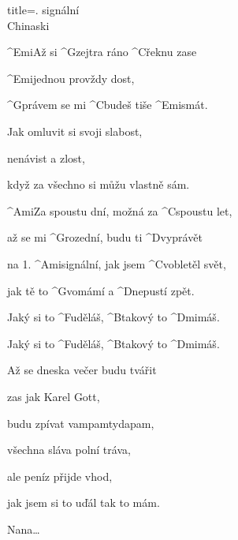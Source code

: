 \begin{song}{title=\predtitle {}. signální \\\large Chinaski  \vspace*{-0.3cm}}  %
\begin{centerjustified}
\nejnejvetsi
\sloka 
	^{Emi}Až si ^{G\z }zejtra ráno ^{C}řeknu zase 

	^{Emi}jednou provždy dost,

	^{G\z }právem se mi ^{C\z }budeš tiše ^{Emi}smát.

	Jak omluvit si svoji slabost,

	nenávist a zlost,

	když za všechno si můžu vlastně sám. 

	^{Ami}Za spoustu dní, možná za ^{C\z }spoustu let, 

	až se mi ^{G\z }rozední, budu ti ^{D\z }vyprávět 

	na 1. ^{Ami\z }signální, jak jsem ^{C\z }vobletěl svět, 

	jak tě to ^{G\z }vomámí a ^{D\z }nepustí zpět.

	Jaký si to ^{F\z }uděláš, ^{B\z }takový to ^{Dmi}máš. 

	Jaký si to ^{F\z }uděláš, ^{B\z }takový to ^{Dmi}máš. 

\sloka
	Až se dneska večer budu tvářit
	
	zas jak Karel Gott, 
	
	budu zpívat vampamtydapam,
	
	všechna sláva polní tráva,
	
	ale peníz přijde vhod,
	
	jak jsem si to uďál tak to mám.


\sloka Nana\elipsa\dots

\end{centerjustified}
\setcounter{Slokočet}{0}
\end{song}
